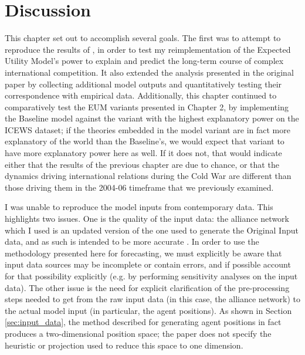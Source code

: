 \section{Discussion} \label{cw_discussion}




This chapter set out to accomplish several goals. The first was to attempt to reproduce the results of \citet{bdm_1998}, in order to test my reimplementation of the Expected Utility Model's power to explain and predict the long-term course of complex international competition. It also extended the analysis presented in the original paper by collecting additional model outputs and quantitatively testing their correspondence with empirical data. Additionally, this chapter continued to comparatively test the EUM variants presented in Chapter 2, by implementing the Baseline model against the variant with the highest explanatory power on the ICEWS dataset; if the theories embedded in the model variant are in fact more explanatory of the world than the Baseline's, we would expect that variant to have more explanatory power here as well. If it does not, that would indicate either that the results of the previous chapter are due to chance, or that the dynamics driving international relations during the Cold War are different than those driving them in the 2004-06 timeframe that we previously examined.

I was unable to reproduce the model inputs from contemporary data. This highlights two issues. One is the quality of the input data: the alliance network which I used is an updated version of the one used to generate the Original Input data, and as such is intended to be more accurate \citep{gibler_2013}. In order to use the methodology presented here for forecasting, we must explicitly be aware that input data sources may be incomplete or contain errors, and if possible account for that possibility explicitly (e.g. by performing sensitivity analyses on the input data). The other issue is the need for explicit clarification of the pre-processing steps needed to get from the raw input data (in this case, the alliance network) to the actual model input (in particular, the agent positions). As shown in Section \ref{sec:input_data}, the method described for generating agent positions in fact produces a two-dimensional position space; the paper does not specify the heuristic or projection used to reduce this space to one dimension.

